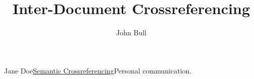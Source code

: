 \documentclass[extrefs]{omdoc}
\title{Inter-Document Crossreferencing}
\author{John Bull}
\begin{document}
\maketitle\newpage
\newpage
\begin{thebibliography}{SCR}
Jane Doe\newblock \href{scr.pdf}{Semantic Crossreferencing}\newblock Personal communication.
\end{thebibliography}
\end{document}
